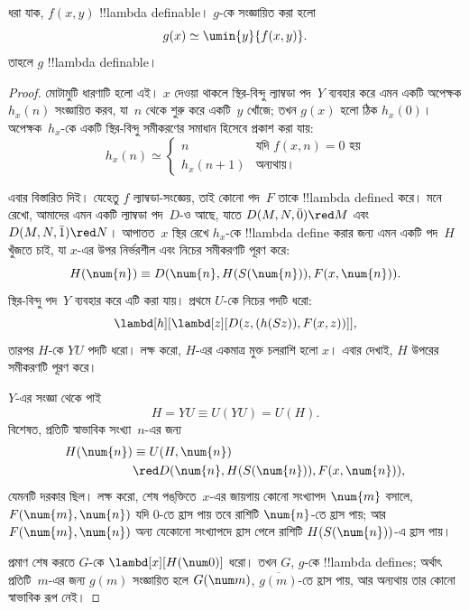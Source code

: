 \documentclass[../../../include/open-logic-section]{subfiles}
\begin{document}

\begin{lem}
ধরা যাক, $f(x,y)$ !!{lambda definable}। $g$-কে সংজ্ঞায়িত করা হলো
\[
g(x) \simeq \umin{y}{f(x,y)}.
\]
তাহলে $g$ !!{lambda definable}।
\end{lem}

\begin{proof}
মোটামুটি ধারণাটি হলো এই। $x$ দেওয়া থাকলে স্থির-বিন্দু ল্যাম্বডা পদ~$Y$
ব্যবহার করে এমন একটি অপেক্ষক $h_x(n)$ সংজ্ঞায়িত করব, যা~$n$ থেকে শুরু
করে একটি~$y$ খোঁজে; তখন $g(x)$ হলো ঠিক $h_x(0)$। অপেক্ষক~$h_x$-কে একটি
স্থির-বিন্দু সমীকরণের সমাধান হিসেবে প্রকাশ করা যায়:
\[
h_x(n) \simeq
\begin{cases}
n & \text{যদি $f(x,n) = 0$ হয়} \\
h_x(n+1) & \text{অন্যথায়।}
\end{cases}
\]

এবার বিস্তারিত দিই। যেহেতু $f$ ল্যাম্বডা-সংজ্ঞেয়, তাই কোনো পদ~$F$ তাকে
!!{lambda defined} করে।
মনে রেখো, আমাদের এমন একটি ল্যাম্বডা পদ~$D$-ও আছে, যাতে $D(M, N,
\bar{0}) \red M$ এবং $D(M, N, \bar{1}) \red N$। আপাতত~$x$ স্থির রেখে
$h_x$-কে !!{lambda define} করার জন্য এমন একটি পদ~$H$ খুঁজতে চাই, যা
$x$-এর উপর নির্ভরশীল এবং নিচের সমীকরণটি পূরণ করে:
\[
H(\num{n}) \equiv D(\num{n}, H(S(\num{n})), F(x, \num{n})).
\]
স্থির-বিন্দু পদ~$Y$ ব্যবহার করে এটি করা যায়। প্রথমে $U$-কে নিচের পদটি
ধরো:
\[
\lambd[h][\lambd[z][D(z,(h(Sz)),F(x,z))]],
\]
তারপর $H$-কে $YU$ পদটি ধরো। লক্ষ করো, $H$-এর একমাত্র মুক্ত চলরাশি হলো
$x$। এবার দেখাই, $H$ উপরের সমীকরণটি পূরণ করে।

$Y$-এর সংজ্ঞা থেকে পাই
\[
H = YU \equiv U(YU) = U(H).
\]
বিশেষত, প্রতিটি স্বাভাবিক সংখ্যা~$n$-এর জন্য
\begin{align*}
H(\num{n}) & \equiv U(H, \num{n}) \\
& \red D(\num{n}, H(S(\num{n})), F(x, \num{n})),
\end{align*}
যেমনটি দরকার ছিল। লক্ষ করো, শেষ পঙ্‌ক্তিতে~$x$-এর জায়গায় কোনো সংখ্যাপদ
$\num{m}$ বসালে, $F(\num{m}, \num{n})$ যদি $\num{0}$-তে হ্রাস পায় তবে
রাশিটি $\num{n}$-তে হ্রাস পায়; আর $F(\num{m}, \num{n})$ অন্য যেকোনো
সংখ্যাপদে হ্রাস পেলে রাশিটি $H(S(\num{n}))$-এ হ্রাস পায়।

প্রমাণ শেষ করতে $G$-কে $\lambd[x][H(\num 0)]$ ধরো। তখন $G$, $g$-কে
!!{lambda define}s; অর্থাৎ প্রতিটি~$m$-এর জন্য $g(m)$ সংজ্ঞায়িত হলে
$G(\num m)$, $\overline {g(m)}$-তে হ্রাস পায়, আর অন্যথায় তার কোনো
স্বাভাবিক রূপ নেই।
\end{proof}
\end{document}
